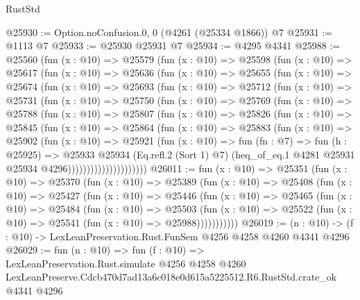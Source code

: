 \begin{lexlean}{RustStd}
\begin{coremodule}
@25930 := Option.noConfusion.{0, 0} (@4261 (@25334 @1866)) @7
@25931 := @1113 @7
@25933 := @25930 @25931 @7
@25934 := @4295 @4341
@25988 := @25560
    (fun (x : @10) =>
    @25579
      (fun (x : @10) =>
      @25598
        (fun (x : @10) =>
        @25617
          (fun (x : @10) =>
          @25636
            (fun (x : @10) =>
            @25655
              (fun (x : @10) =>
              @25674
                (fun (x : @10) =>
                @25693
                  (fun (x : @10) =>
                  @25712
                    (fun (x : @10) =>
                    @25731
                      (fun (x : @10) =>
                      @25750
                        (fun (x : @10) =>
                        @25769
                          (fun (x : @10) =>
                          @25788
                            (fun (x : @10) =>
                            @25807
                              (fun (x : @10) =>
                              @25826
                                (fun (x : @10) =>
                                @25845
                                  (fun (x : @10) =>
                                  @25864
                                    (fun (x : @10) =>
                                    @25883
                                      (fun (x : @10) =>
                                      @25902
                                        (fun (x : @10) =>
                                        @25921
                                          (fun (x : @10) =>
                                          fun (fn : @7) =>
                                          fun (h : @25925) =>
                                          @25933
                                            @25934
                                            (Eq.refl.{2} (Sort 1) @7)
                                            (heq_of_eq.{1}
                                              @4281
                                              @25931
                                              @25934
                                              @4296)))))))))))))))))))))
@26011 := fun (x : @10) =>
  @25351
    (fun (x : @10) =>
    @25370
      (fun (x : @10) =>
      @25389
        (fun (x : @10) =>
        @25408
          (fun (x : @10) =>
          @25427
            (fun (x : @10) =>
            @25446
              (fun (x : @10) =>
              @25465
                (fun (x : @10) =>
                @25484
                  (fun (x : @10) =>
                  @25503
                    (fun (x : @10) =>
                    @25522 (fun (x : @10) => @25541 (fun (x : @10) => @25988)))))))))))
@26019 := (n : @10) -> (f : @10) -> LexLeanPreservation.Rust.FunSem @4256 @4258 @4260 @4341 @4296
@26029 := fun (n : @10) =>
  fun (f : @10) =>
  LexLeanPreservation.Rust.simulate
    @4256
    @4258
    @4260
    LexLeanPreserve.Cdcb470d7ad13a6c018e0d615a5225512.R6.RustStd.crate_ok
    @4341
    @4296
\end{coremodule}
\end{lexlean}
